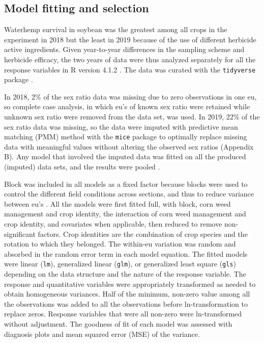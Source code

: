 \documentclass[utf8]{frontiersSCNS}
\begin{document}
\hypertarget{model-fitting-and-selection}{%
\subsection*{Model fitting and selection}\label{model-fitting-and-selection}}

Waterhemp survival in soybean was the greatest among all crops in the experiment in 2018 but the least in 2019 because of the use of different herbicide active ingredients. Given year-to-year differences in the sampling scheme and herbicide efficacy, the two years of data were thus analyzed separately for all the response variables in R version 4.1.2 \citep{rdevelopmentcoreteamLanguageEnvironmentStatistical2021}. The data was curated with the \texttt{tidyverse} package \citep[version 1.3.1,][]{wickhamTidyverseEasilyInstall2021}.

In 2018, 2\% of the sex ratio data was missing due to zero observations in one eu, so complete case analysis, in which eu's of known sex ratio were retained while unknown sex ratio were removed from the data set, was used. In 2019, 22\% of the sex ratio data was missing, so the data were imputed with predictive mean matching (PMM) method with the \texttt{mice} package \citep[version 3.13.0,][]{vanbuurenMiceMultivariateImputation2011} to optimally replace missing data with meaningful values without altering the observed sex ratios (Appendix B). Any model that involved the imputed data was fitted on all the produced (imputed) data sets, and the results were pooled \citep{whiteMultipleImputationUsing2011}.

Block was included in all models as a fixed factor because blocks were used to control the different field conditions across sections, and thus to reduce variance between eu's \citep{dixonShouldBlocksBe2016}. All the models were first fitted full, with block, corn weed management and crop identity, the interaction of corn weed management and crop identity, and covariates when applicable, then reduced to remove non-significant factors. Crop identities are the combination of crop species and the rotation to which they belonged. The within-eu variation was random and absorbed in the random error term in each model equation. The fitted models were linear (\texttt{lm}), generalized linear (\texttt{glm}), or generalized least square (\texttt{gls}) depending on the data structure and the nature of the response variable. The response and quantitative variables were appropriately transformed as needed to obtain homogeneous variances. Half of the minimum, non-zero value among all the observations was added to all the observations before ln-transformation to replace zeros. Response variables that were all non-zero were ln-transformed without adjustment. The goodness of fit of each model was assessed with diagnosis plots and mean squared error (MSE) of the variance.
\end{document}
